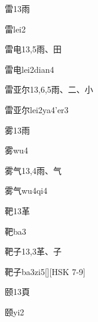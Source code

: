 \begin{Entry}{雷}{13}{⾬}
  \begin{Phonetics}{雷}{lei2}
  \end{Phonetics}
\end{Entry}

\begin{Entry}{雷电}{13,5}{⾬、⽥}
  \begin{Phonetics}{雷电}{lei2dian4}
  \end{Phonetics}
\end{Entry}

\begin{Entry}{雷亚尔}{13,6,5}{⾬、⼆、⼩}
  \begin{Phonetics}{雷亚尔}{lei2ya4'er3}
  \end{Phonetics}
\end{Entry}

\begin{Entry}{雾}{13}{⾬}
  \begin{Phonetics}{雾}{wu4}
  \end{Phonetics}
\end{Entry}

\begin{Entry}{雾气}{13,4}{⾬、⽓}
  \begin{Phonetics}{雾气}{wu4qi4}
  \end{Phonetics}
\end{Entry}

\begin{Entry}{靶}{13}{⾰}
  \begin{Phonetics}{靶}{ba3}
  \end{Phonetics}
\end{Entry}

\begin{Entry}{靶子}{13,3}{⾰、⼦}
  \begin{Phonetics}{靶子}{ba3zi5}[][HSK 7-9]
  \end{Phonetics}
\end{Entry}

\begin{Entry}{颐}{13}{⾴}
  \begin{Phonetics}{颐}{yi2}
  \end{Phonetics}
\end{Entry}

